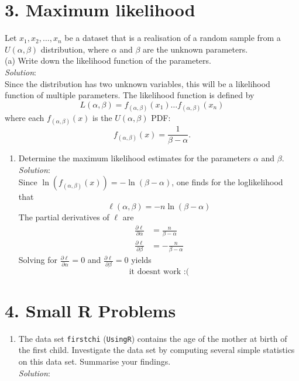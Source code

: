 \documentclass[
]{article}
\providecommand{\tightlist}{%
  \setlength{\itemsep}{0pt}\setlength{\parskip}{0pt}}
\begin{document}
\hypertarget{maximum-likelihood}{%
\section{3. Maximum likelihood}\label{maximum-likelihood}}

Let \(x_1,x_2,\dots,x_n\) be a dataset that is a realisation of a random
sample from a \(U(\alpha,\beta)\) distribution, where \(\alpha\) and
\(\beta\) are the unknown parameters.\\
(a) Write down the likelihood function of the parameters.\\
\emph{Solution}:\\
Since the distribution has two unknown variables, this will be a
likelihood function of multiple parameters. The likelihood function is
defined by \[
L(\alpha,\beta)=f_{(\alpha,\beta)}(x_1)\dots f_{(\alpha,\beta)}(x_n)
\] where each \(f_{(\alpha,\beta)}(x)\) is the \(U(\alpha,\beta)\) PDF:
\[
f_{(\alpha,\beta)}(x)=\frac{1}{\beta-\alpha}.
\]

\begin{enumerate}
\def\labelenumi{(\alph{enumi})}
\setcounter{enumi}{1}
\tightlist
\item
  Determine the maximum likelihood estimates for the parameters
  \(\alpha\) and \(\beta\).\\
  \emph{Solution}:\\
  Since \(\ln(f_{(\alpha,\beta)}(x))=-\ln(\beta-\alpha)\), one finds for
  the loglikelihood that \[
  \ell(\alpha,\beta)=-n\ln(\beta-\alpha)
  \] The partial derivatives of \(\ell\) are \[
  \begin{aligned}
  \frac{\partial\ell}{\partial\alpha}&=\frac{n}{\beta-\alpha} \\
  \frac{\partial\ell}{\partial\beta}&=-\frac{n}{\beta-\alpha}
  \end{aligned}
  \] Solving for \(\frac{\partial\ell}{\partial\alpha}=0\) and
  \(\frac{\partial\ell}{\partial\beta}=0\) yields \[
  \text{it doesnt work :(}
  \]
\end{enumerate}

\hypertarget{small-r-problems}{%
\section{4. Small R Problems}\label{small-r-problems}}

\begin{enumerate}
\def\labelenumi{(\alph{enumi})}
\tightlist
\item
  The data set \texttt{firstchi} (\texttt{UsingR}) contains the age of
  the mother at birth of the first child. Investigate the data set by
  computing several simple statistics on this data set. Summarise your
  findings.\\
  \emph{Solution}:
\end{enumerate}
\end{document}
